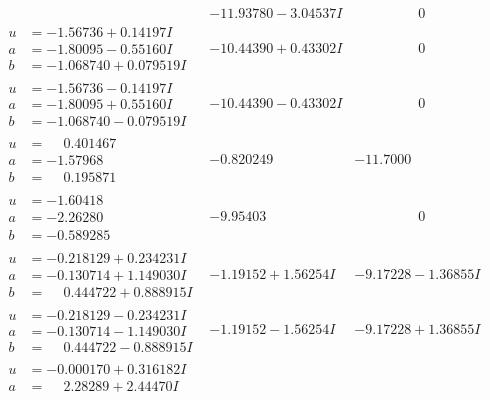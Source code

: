 \documentclass[1p]{elsarticle_modified}
\theoremstyle{definition}
\begin{document}
$$\begin{array}{c|c|c}
 & -11.93780 - 3.04537 I & \phantom{-0.000000 } 0 \\ \hline\begin{aligned}
u &= -1.56736 + 0.14197 I \\
a &= -1.80095 - 0.55160 I \\
b &= -1.068740 + 0.079519 I\end{aligned}
 & -10.44390 + 0.43302 I & \phantom{-0.000000 } 0 \\ \hline\begin{aligned}
u &= -1.56736 - 0.14197 I \\
a &= -1.80095 + 0.55160 I \\
b &= -1.068740 - 0.079519 I\end{aligned}
 & -10.44390 - 0.43302 I & \phantom{-0.000000 } 0 \\ \hline\begin{aligned}
u &= \phantom{-}0.401467\phantom{ +0.000000I} \\
a &= -1.57968\phantom{ +0.000000I} \\
b &= \phantom{-}0.195871\phantom{ +0.000000I}\end{aligned}
 & -0.820249\phantom{ +0.000000I} & -11.7000\phantom{ +0.000000I} \\ \hline\begin{aligned}
u &= -1.60418\phantom{ +0.000000I} \\
a &= -2.26280\phantom{ +0.000000I} \\
b &= -0.589285\phantom{ +0.000000I}\end{aligned}
 & -9.95403\phantom{ +0.000000I} & \phantom{-0.000000 } 0 \\ \hline\begin{aligned}
u &= -0.218129 + 0.234231 I \\
a &= -0.130714 + 1.149030 I \\
b &= \phantom{-}0.444722 + 0.888915 I\end{aligned}
 & -1.19152 + 1.56254 I & -9.17228 - 1.36855 I \\ \hline\begin{aligned}
u &= -0.218129 - 0.234231 I \\
a &= -0.130714 - 1.149030 I \\
b &= \phantom{-}0.444722 - 0.888915 I\end{aligned}
 & -1.19152 - 1.56254 I & -9.17228 + 1.36855 I \\ \hline\begin{aligned}
u &= -0.000170 + 0.316182 I \\
a &= \phantom{-}2.28289 + 2.44470 I \\

\end{aligned}
\end{array}$$
\end{document}
